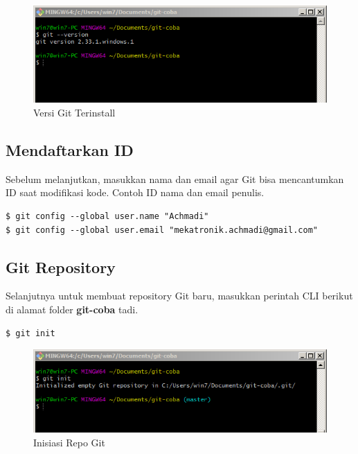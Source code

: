 \documentclass[12pt]{book}
\begin{document}
	\begin{figure}[!ht]
		\centering
		\includegraphics[width=400pt]{images/git0}
		\caption{Versi Git Terinstall}
	\end{figure}
	 
	\subsection{Mendaftarkan ID}
	
	Sebelum melanjutkan, masukkan nama dan email agar Git bisa mencantumkan ID saat modifikasi kode.
	Contoh ID nama dan email penulis.
	\begin{verbatim}
$ git config --global user.name "Achmadi"
$ git config --global user.email "mekatronik.achmadi@gmail.com"
	\end{verbatim}

	\subsection{Git Repository}
	
	Selanjutnya untuk membuat repository Git baru, masukkan perintah CLI berikut di alamat folder \textbf{git-coba} tadi.
	\begin{verbatim}
$ git init
	\end{verbatim}

	\begin{figure}[!ht]
		\centering
		\includegraphics[width=400pt]{images/git1}
		\caption{Inisiasi Repo Git}
	\end{figure}
\end{document}
